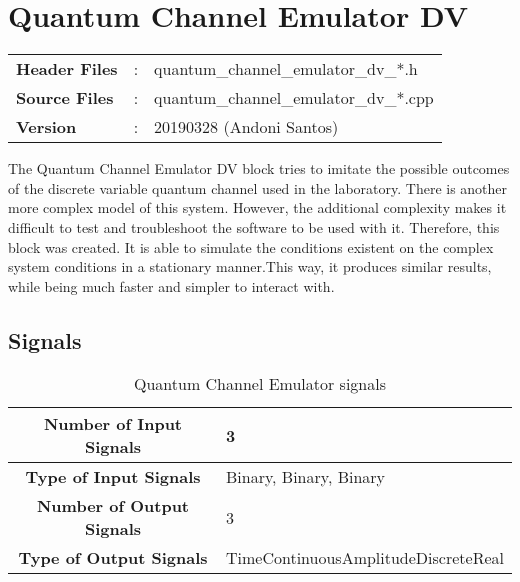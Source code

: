 \clearpage
\graphicspath{{./lib/quantum_channel_emulator_dv/figures/}}
\section{Quantum Channel Emulator DV}

\begin{tcolorbox}	
	\begin{tabular}{p{2.75cm} p{0.2cm} p{10.5cm}} 	
        \textbf{Header Files}    &:& quantum\_channel\_emulator\_dv\_*.h \\
		\textbf{Source Files}    &:& quantum\_channel\_emulator\_dv\_*.cpp \\
        \textbf{Version}        &:& 20190328 (Andoni Santos)
	\end{tabular}
\end{tcolorbox}

\maketitle
The Quantum Channel Emulator DV block tries to imitate the possible outcomes
of the discrete variable quantum channel used in the laboratory.
There is another more complex model of this system. However, the additional
complexity makes it difficult to test and troubleshoot the software to be used
with it. Therefore, this block was created. It is able to simulate the
conditions existent on the complex system conditions in a stationary manner.This
way, it produces similar results, while being much faster and simpler to
interact with.


\subsection*{Signals}

\begin{table}[h]
	\begin{tabular}{|c|l|}
		\hline
		\textbf{Number of Input Signals} & 3 \\ \hline
        \textbf{Type of Input Signals} & Binary, Binary, Binary \\ \hline
    	\textbf{Number of Output Signals} & 3 \\ \hline
		\textbf{Type of Output Signals} & TimeContinuousAmplitudeDiscreteReal \\ \hline
	\end{tabular}
	\caption{Quantum Channel Emulator signals}
	\label{table:QCE_signals}
\end{table}

